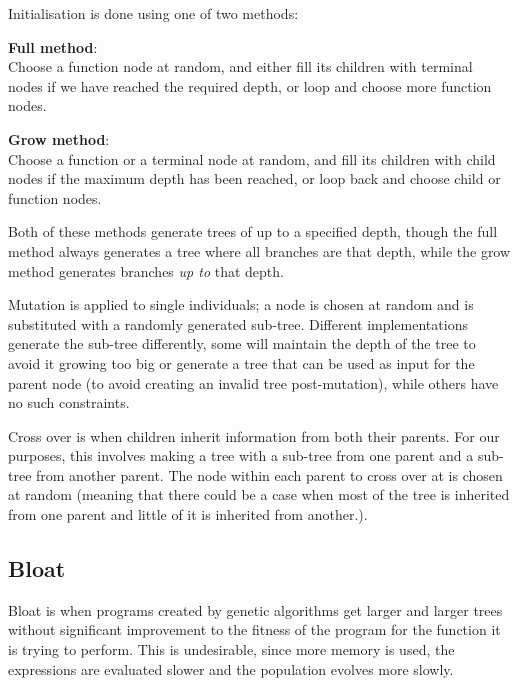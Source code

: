 Initialisation is done using one of two methods:

\begin{description}
\item \textbf{Full method}:\\ Choose a function node at random, and
either fill its children with terminal nodes if we have reached the
required depth, or loop and choose more function nodes.
\item \textbf{Grow method}:\\ Choose a function or a terminal node at
random, and fill its children with child nodes if the maximum depth
has been reached, or loop back and choose child or function nodes.
\end{description}

Both of these methods generate trees of up to a specified depth,
though the full method always generates a tree where all branches are
that depth, while the grow method generates branches \textit{up to}
that depth.

Mutation is applied to single individuals; a node is chosen at random
and is substituted with a randomly generated sub-tree. Different
implementations generate the sub-tree differently, some will maintain
the depth of the tree to avoid it growing too big or generate a tree
that can be used as input for the parent node (to avoid creating an
invalid tree post-mutation), while others have no such constraints.



Cross over is when children inherit information from both their
parents. For our purposes, this involves making a tree with a sub-tree
from one parent and a sub-tree from another parent. The node within
each parent to cross over at is chosen at random (meaning that there
could be a case when most of the tree is inherited from one parent and
little of it is inherited from another.).


\subsection{Bloat}

Bloat is when programs created by genetic algorithms get larger and
larger trees without significant improvement to the fitness of the
program for the function it is trying to perform. This is undesirable,
since more memory is used, the expressions are evaluated slower and
the population evolves more slowly.

